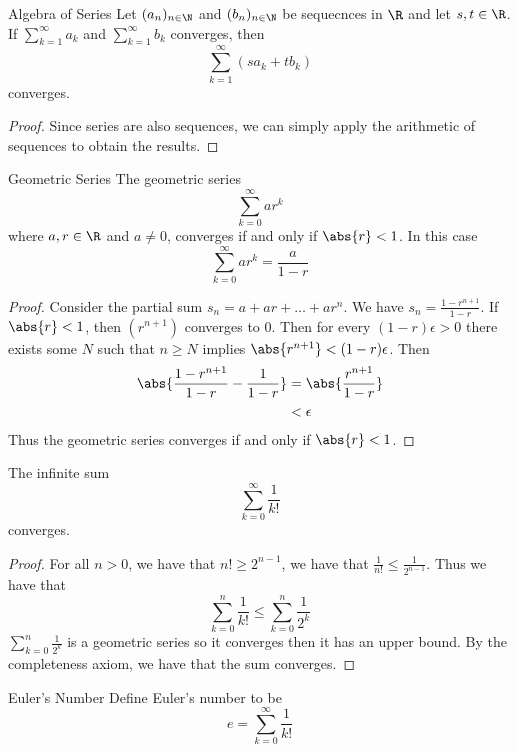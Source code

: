 \begin{thm}{Algebra of Series}{} Let $(a_n)_{n\in\N}$ and $(b_n)_{n\in\N}$ be sequecnces in $\R$ and let $s,t\in\R$. If $\sum_{k=1}^\infty a_k$ and $\sum_{k=1}^\infty b_k$ converges, then $$\sum_{k=1}^\infty(sa_k+tb_k)$$ converges. \tcbline
\begin{proof} Since series are also sequences, we can simply apply the arithmetic of sequences to obtain the results. 
\end{proof}
\end{thm}

\begin{thm}{Geometric Series}{} The geometric series $$\sum_{k=0}^{\infty}ar^k$$ where $a,r\in\R$ and $a\neq0$, converges if and only if $\abs{r}<1$. In this case $$\sum_{k=0}^{\infty}ar^k=\frac{a}{1-r}$$ \tcbline
\begin{proof} Consider the partial sum $s_n=a+ar+\dots+ar^{n}$. We have $s_n=\frac{1-r^{n+1}}{1-r}$. If $\abs{r}<1$, then $(r^{n+1})$ converges to $0$. Then for every $(1-r)\epsilon>0$ there exists some $N$ such that $n\geq N$ implies $\abs{r^{n+1}}<(1-r)\epsilon$. Then
\begin{align*}
\abs{\frac{1-r^{n+1}}{1-r}-\frac{1}{1-r}}&=\abs{\frac{r^{n+1}}{1-r}}\\
&<\epsilon
\end{align*} Thus the geometric series converges if and only if $\abs{r}<1$. 
\end{proof}
\end{thm}

\begin{crl}{}{} The infinite sum $$\sum_{k=0}^{\infty}\frac{1}{k!}$$ converges. \tcbline
\begin{proof}  For all $n>0$, we have that $n!\geq2^{n-1}$, we have that $\frac{1}{n!}\leq\frac{1}{2^{n-1}}$. Thus we have that $$\sum_{k=0}^{n}\frac{1}{k!}\leq\sum_{k=0}^{n}\frac{1}{2^{k}}$$ $\sum_{k=0}^{n}\frac{1}{2^{k}}$ is a geometric series so it converges then it has an upper bound. By the completeness axiom, we have that the sum converges. 
\end{proof}
\end{crl}

\begin{defn}{Euler's Number}{} Define Euler's number to be $$e=\sum_{k=0}^{\infty}\frac{1}{k!}$$
\end{defn}

